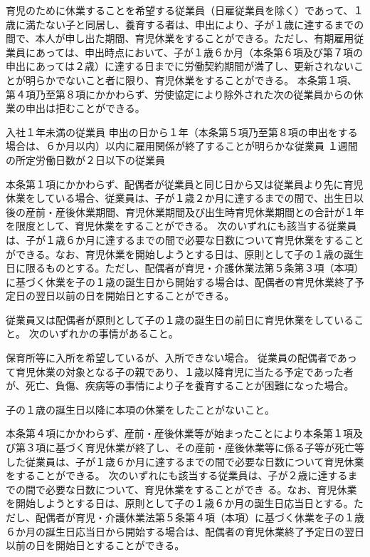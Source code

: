 \documentclass[10pt,a4paper,uplatex]{jsarticle}
\begin{document}
育児のために休業することを希望する従業員（日雇従業員を除く）であって、１歳に満たない子と同居し、養育する者は、申出により、子が１歳に達するまでの間で、本人が申し出た期間、育児休業をすることができる。ただし、有期雇用従業員にあっては、申出時点において、子が１歳６か月（本条第６項及び第７項の申出にあっては２歳）に達する日までに労働契約期間が満了し、更新されないことが明らかでないこと者に限り、育児休業をすることができる。
\label{para:ChildcareLayoff}
\term 本条第１項、第４項乃至第８項にかかわらず、労使協定により除外された次の従業員からの休業の申出は拒むことができる。
\begin{enumerate}
    \itm 入社１年未満の従業員
    \itm 申出の日から１年（本条第５項乃至第８項の申出をする場合は、６か月以内）以内に雇用関係が終了することが明らかな従業員
    \itm １週間の所定労働日数が２日以下の従業員
\end{enumerate}
\term 本条第１項にかかわらず、配偶者が従業員と同じ日から又は従業員より先に育児休業をしている場合、従業員は、子が１歳２か月に達するまでの間で、出生日以後の産前・産後休業期間、育児休業期間及び出生時育児休業期間との合計が１年を限度として、育児休業をすることができる。
\label{para:ikukyuplus}
\term 次のいずれにも該当する従業員は、子が１歳６か月に達するまでの間で必要な日数について育児休業をすることができる。なお、育児休業を開始しようとする日は、原則として子の１歳の誕生日に限るものとする。ただし、配偶者が育児・介護休業法第５条第３項（本項）に基づく休業を子の１歳の誕生日から開始する場合は、配偶者の育児休業終了予定日の翌日以前の日を開始日とすることができる。
\begin{enumerate}
    \itm 従業員又は配偶者が原則として子の１歳の誕生日の前日に育児休業をしていること。
    \itm 次のいずれかの事情があること。
    \begin{enumerate}
        \itm 保育所等に入所を希望しているが、入所できない場合。
        \itm 従業員の配偶者であって育児休業の対象となる子の親であり、１歳以降育児に当たる予定であった者が、死亡、負傷、疾病等の事情により子を養育することが困難になった場合。
    \end{enumerate}
    \itm 子の１歳の誕生日以降に本項の休業をしたことがないこと。
\end{enumerate}
\term 本条第４項にかかわらず、産前・産後休業等が始まったことにより本条第１項及び第３項に基づく育児休業が終了し、その産前・産後休業等に係る子等が死亡等した従業員は、子が１歳６か月に達するまでの間で必要な日数について育児休業をすることができる。
\term 次のいずれにも該当する従業員は、子が２歳に達するまでの間で必要な日数について、育児休業をすることができ
る。なお、育児休業を開始しようとする日は、原則として子の１歳６か月の誕生日応当日とする。ただし、配偶者が育児・介護休業法第５条第４項（本項）に基づく休業を子の１歳６か月の誕生日応当日から開始する場合は、配偶者の育児休業終了予定日の翌日以前の日を開始日とすることができる。
\end{document}
